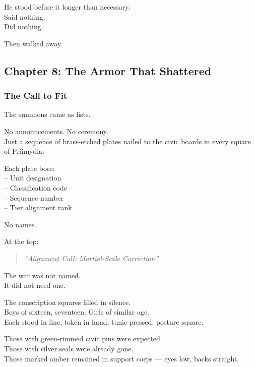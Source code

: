 \documentclass[12pt]{article}
\begin{document}
He stood before it longer than necessary.\\
Said nothing.\\
Did nothing.

Then walked away.

\newpage

\subsection*{Chapter 8: The Armor That Shattered}

\vspace{.5in}

\subsubsection*{The Call to Fit}

The summons came as lists.

No announcements. No ceremony.\\
Just a sequence of brass-etched plates nailed to the civic boards in every square of Priimydia.

Each plate bore:\\
\hspace*{1em}-- Unit designation\\
\hspace*{1em}-- Classification code\\
\hspace*{1em}-- Sequence number\\
\hspace*{1em}-- Tier alignment rank

No names.

At the top:

\begin{quote}
\textit{“Alignment Call: Martial-Scale Correction”}
\end{quote}

The war was not named.\\
It did not need one.

\vspace{1em}

The conscription squares filled in silence.\\
Boys of sixteen, seventeen. Girls of similar age.\\
Each stood in line, token in hand, tunic pressed, posture square.

Those with green-rimmed civic pins were expected.\\
Those with silver seals were already gone.\\
Those marked amber remained in support corps — eyes low, backs straight.
\end{document}

